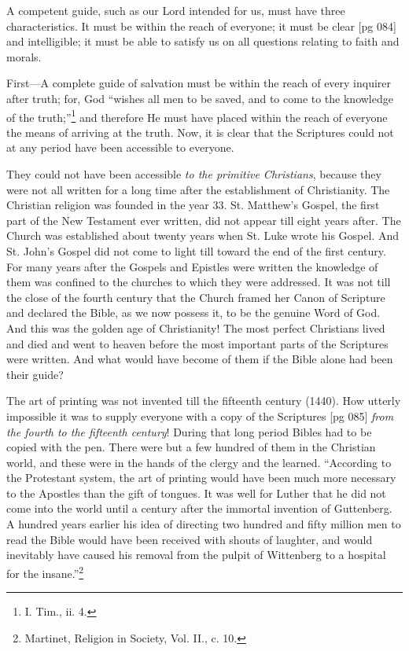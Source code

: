 A competent guide, such as our Lord intended
for us, must have three characteristics. It must
be within the reach of everyone; it must be clear
[pg 084]
and intelligible; it must be able to satisfy us on
all questions relating to faith and morals.

First—A complete guide of salvation must be
within the reach of every inquirer after truth;
for, God “wishes all men to be saved, and to
come to the knowledge of the truth;”\footnote{I.
Tim., ii. 4.} and therefore
He must have placed within the reach of
everyone the means of arriving at the truth. Now,
it is clear that the Scriptures could not at any
period have been accessible to everyone.

They could not have been accessible \emph{to the
primitive Christians}, because they were not all
written for a long time after the establishment
of Christianity. The Christian religion was
founded in the year 33. St. Matthew's Gospel,
the first part of the New Testament ever written,
did not appear till eight years after. The Church
was established about twenty years when St. Luke
wrote his Gospel. And St. John's Gospel did not
come to light till toward the end of the first century.
For many years after the Gospels and
Epistles were written the knowledge of them was
confined to the churches to which they were addressed.
It was not till the close of the fourth
century that the Church framed her Canon of
Scripture and declared the Bible, as we now possess
it, to be the genuine Word of God. And this
was the golden age of Christianity! The most
perfect Christians lived and died and went to
heaven before the most important parts of the
Scriptures were written. And what would have
become of them if the Bible alone had been their
guide?

The art of printing was not invented till the
fifteenth century (1440). How utterly impossible it
was to supply everyone with a copy of the Scriptures
[pg 085]
\emph{from the fourth to the fifteenth century}!
During that long period Bibles had to be copied
with the pen. There were but a few hundred of them
in the Christian world, and these were in the hands
of the clergy and the learned. “According to the
Protestant system, the art of printing would have
been much more necessary to the Apostles than
the gift of tongues. It was well for Luther that
he did not come into the world until a century
after the immortal invention of Guttenberg. A
hundred years earlier his idea of directing two
hundred and fifty million men to read the
Bible would have been received with shouts of
laughter, and would inevitably have caused his
removal from the pulpit of Wittenberg to a hospital
for the insane.”\footnote{Martinet,
Religion in Society, Vol. II., c. 10.}

